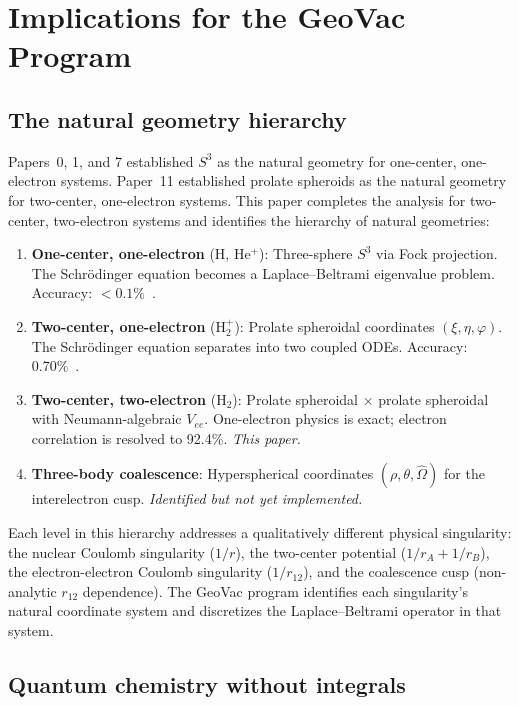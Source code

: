 \documentclass[aps,pra,twocolumn,superscriptaddress,longbibliography]{revtex4-2}
\begin{document}
\section{Implications for the GeoVac Program}
\label{sec:implications}

\subsection{The natural geometry hierarchy}

Papers~0, 1, and 7 established $S^3$ as the natural geometry
for one-center, one-electron systems.  Paper~11 established
prolate spheroids as the natural geometry for two-center,
one-electron systems.  This paper completes the analysis for
two-center, two-electron systems and identifies the hierarchy
of natural geometries:

\begin{enumerate}
  \item \textbf{One-center, one-electron} (H, He$^+$):
    Three-sphere $S^3$ via Fock projection.  The Schr\"odinger
    equation becomes a Laplace--Beltrami eigenvalue problem.
    Accuracy: $< 0.1\%$~\cite{loutey_paper0, loutey_paper1}.
  \item \textbf{Two-center, one-electron} (H$_2^+$):
    Prolate spheroidal coordinates $(\xi, \eta, \varphi)$.
    The Schr\"odinger equation separates into two coupled ODEs.
    Accuracy: 0.70\%~\cite{loutey_paper11}.
  \item \textbf{Two-center, two-electron} (H$_2$):
    Prolate spheroidal $\times$ prolate spheroidal with
    Neumann-algebraic $V_{ee}$.  One-electron physics is
    exact; electron correlation is resolved to 92.4\%.
    \emph{This paper.}
  \item \textbf{Three-body coalescence}: Hyperspherical
    coordinates $(\rho, \theta, \hat{\Omega})$ for the
    interelectron cusp.  \emph{Identified but not yet
    implemented.}
\end{enumerate}

Each level in this hierarchy addresses a qualitatively different
physical singularity: the nuclear Coulomb singularity ($1/r$),
the two-center potential ($1/r_A + 1/r_B$), the electron-electron
Coulomb singularity ($1/r_{12}$), and the coalescence cusp
(non-analytic $r_{12}$ dependence).  The GeoVac program
identifies each singularity's natural coordinate system and
discretizes the Laplace--Beltrami operator in that system.

\subsection{Quantum chemistry without integrals}
\end{document}
